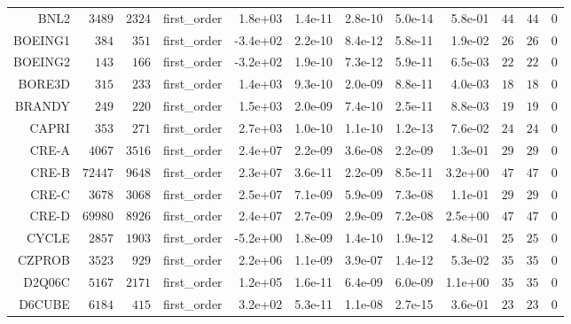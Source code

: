 \begin{longtable}{rrrrrrrrrrrr}
  BNL2 & \(  3489\) & \(  2324\) & first\_order &  1.8e+03 &  1.4e-11 &  2.8e-10 &  5.0e-14 &  5.8e-01 & \(    44\) & \(    44\) & \(     0\) \\
  BOEING1 & \(   384\) & \(   351\) & first\_order & -3.4e+02 &  2.2e-10 &  8.4e-12 &  5.8e-11 &  1.9e-02 & \(    26\) & \(    26\) & \(     0\) \\
  BOEING2 & \(   143\) & \(   166\) & first\_order & -3.2e+02 &  1.9e-10 &  7.3e-12 &  5.9e-11 &  6.5e-03 & \(    22\) & \(    22\) & \(     0\) \\
  BORE3D & \(   315\) & \(   233\) & first\_order &  1.4e+03 &  9.3e-10 &  2.0e-09 &  8.8e-11 &  4.0e-03 & \(    18\) & \(    18\) & \(     0\) \\
  BRANDY & \(   249\) & \(   220\) & first\_order &  1.5e+03 &  2.0e-09 &  7.4e-10 &  2.5e-11 &  8.8e-03 & \(    19\) & \(    19\) & \(     0\) \\
  CAPRI & \(   353\) & \(   271\) & first\_order &  2.7e+03 &  1.0e-10 &  1.1e-10 &  1.2e-13 &  7.6e-02 & \(    24\) & \(    24\) & \(     0\) \\
  CRE-A & \(  4067\) & \(  3516\) & first\_order &  2.4e+07 &  2.2e-09 &  3.6e-08 &  2.2e-09 &  1.3e-01 & \(    29\) & \(    29\) & \(     0\) \\
  CRE-B & \( 72447\) & \(  9648\) & first\_order &  2.3e+07 &  3.6e-11 &  2.2e-09 &  8.5e-11 &  3.2e+00 & \(    47\) & \(    47\) & \(     0\) \\
  CRE-C & \(  3678\) & \(  3068\) & first\_order &  2.5e+07 &  7.1e-09 &  5.9e-09 &  7.3e-08 &  1.1e-01 & \(    29\) & \(    29\) & \(     0\) \\
  CRE-D & \( 69980\) & \(  8926\) & first\_order &  2.4e+07 &  2.7e-09 &  2.9e-09 &  7.2e-08 &  2.5e+00 & \(    47\) & \(    47\) & \(     0\) \\
  CYCLE & \(  2857\) & \(  1903\) & first\_order & -5.2e+00 &  1.8e-09 &  1.4e-10 &  1.9e-12 &  4.8e-01 & \(    25\) & \(    25\) & \(     0\) \\
  CZPROB & \(  3523\) & \(   929\) & first\_order &  2.2e+06 &  1.1e-09 &  3.9e-07 &  1.4e-12 &  5.3e-02 & \(    35\) & \(    35\) & \(     0\) \\
  D2Q06C & \(  5167\) & \(  2171\) & first\_order &  1.2e+05 &  1.6e-11 &  6.4e-09 &  6.0e-09 &  1.1e+00 & \(    35\) & \(    35\) & \(     0\) \\
  D6CUBE & \(  6184\) & \(   415\) & first\_order &  3.2e+02 &  5.3e-11 &  1.1e-08 &  2.7e-15 &  3.6e-01 & \(    23\) & \(    23\) & \(     0\) \\

\end{longtable}
